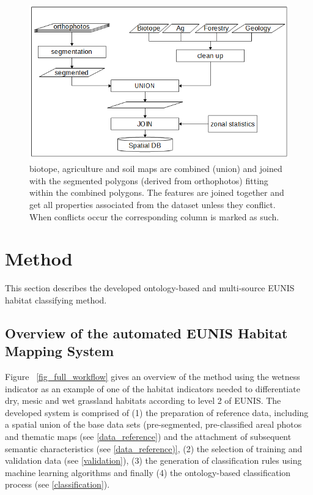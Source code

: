\documentclass[authoryear, review,12pt,number]{elsarticle}
\begin{document}
\begin{figure} \includegraphics[width=1\textwidth]{diagrams/pre_processing.png}
    \caption{biotope, agriculture and soil maps are combined 
    (union) and joined with the segmented polygons (derived from orthophotos) 
    fitting within the combined polygons. The features are joined together 
    and get all properties associated from the dataset unless they conflict. 
    When conflicts occur the corresponding column is marked as such.}
\label{fig_pre-processing}
\end{figure}
\section{Method}
This section describes the developed ontology-based and multi-source EUNIS habitat
classifying method.
\label{subsec:method_overview}
\subsection{Overview of the automated EUNIS Habitat Mapping System}
Figure ~\ref{fig_full_workflow} gives an overview of the method using the
wetness indicator as an example of one of the habitat indicators needed to
differentiate dry, mesic and wet grassland habitats according to level 2 of
EUNIS. The developed system is comprised of (1) the preparation of reference
data, including a spatial union of the base data sets (pre-segmented,
pre-classified areal photos and thematic maps (see \ref{data_reference}) and the
attachment of subsequent semantic characteristics (see \ref{data_reference)},
(2) the selection of training and validation data (see \ref{validation}), (3)
the generation of classification rules using machine learning algorithms and
finally (4) the ontology-based classification process (see
\ref{classification}).
\label{subsec:software}
\end{document}

